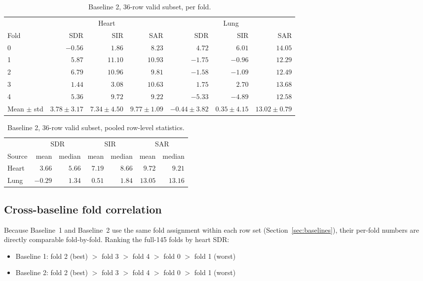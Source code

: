 \documentclass[11pt]{article}
\begin{document}
\begin{table}[H]
\centering
\caption{Baseline 2, 36-row valid subset, per fold.}
\small
\begin{tabular}{@{}lrrrrrr@{}}
\toprule
& \multicolumn{3}{c}{Heart} & \multicolumn{3}{c}{Lung} \\
Fold & SDR & SIR & SAR & SDR & SIR & SAR \\
\midrule
0 & $-0.56$ & $1.86$  & $8.23$  & $4.72$  & $6.01$  & $14.05$ \\
1 & $5.87$  & $11.10$ & $10.93$ & $-1.75$ & $-0.96$ & $12.29$ \\
2 & $6.79$  & $10.96$ & $9.81$  & $-1.58$ & $-1.09$ & $12.49$ \\
3 & $1.44$  & $3.08$  & $10.63$ & $1.75$  & $2.70$  & $13.68$ \\
4 & $5.36$  & $9.72$  & $9.22$  & $-5.33$ & $-4.89$ & $12.58$ \\
\midrule
Mean $\pm$ std & $3.78\pm3.17$ & $7.34\pm4.50$ & $9.77\pm1.09$ & $-0.44\pm3.82$ & $0.35\pm4.15$ & $13.02\pm0.79$ \\
\bottomrule
\end{tabular}
\end{table}

\begin{table}[H]
\centering
\caption{Baseline 2, 36-row valid subset, pooled row-level statistics.}
\small
\begin{tabular}{@{}lrrrrrr@{}}
\toprule
& \multicolumn{2}{c}{SDR} & \multicolumn{2}{c}{SIR} & \multicolumn{2}{c}{SAR} \\
Source & mean & median & mean & median & mean & median \\
\midrule
Heart & $3.66$ & $5.66$ & $7.19$ & $8.66$ & $9.72$ & $9.21$ \\
Lung  & $-0.29$ & $1.34$ & $0.51$ & $1.84$ & $13.05$ & $13.16$ \\
\bottomrule
\end{tabular}
\end{table}

\subsection{Cross-baseline fold correlation}
\label{sec:foldcorr}

Because Baseline~1 and Baseline~2 use the same fold assignment within each
row set (Section~\ref{sec:baselines}), their per-fold numbers are directly
comparable fold-by-fold. Ranking the full-145 folds by heart SDR:

\begin{itemize}
  \item Baseline 1: fold 2 (best) $>$ fold 3 $>$ fold 4 $>$ fold 0 $>$ fold 1 (worst)
  \item Baseline 2: fold 2 (best) $>$ fold 3 $>$ fold 4 $>$ fold 0 $>$ fold 1 (worst)
\end{itemize}
\end{document}
